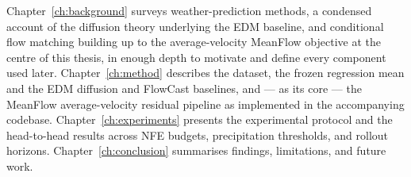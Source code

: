 Chapter~\ref{ch:background} surveys weather-prediction methods, a condensed account of the diffusion theory underlying the EDM baseline, and conditional flow matching building up to the average-velocity MeanFlow objective at the centre of this thesis, in enough depth to motivate and define every component used later. Chapter~\ref{ch:method} describes the dataset, the frozen regression mean and the EDM diffusion and FlowCast baselines, and --- as its core --- the MeanFlow average-velocity residual pipeline as implemented in the accompanying codebase. Chapter~\ref{ch:experiments} presents the experimental protocol and the head-to-head results across NFE budgets, precipitation thresholds, and rollout horizons. Chapter~\ref{ch:conclusion} summarises findings, limitations, and future work.
